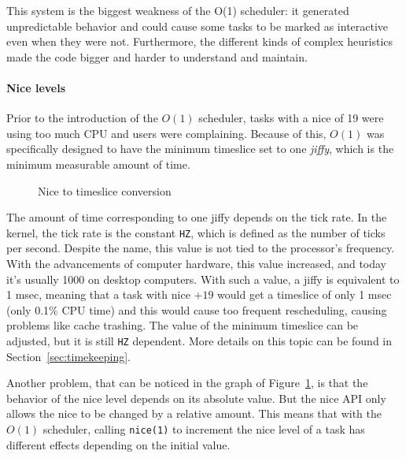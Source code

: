 This system is the biggest weakness of the O(1) scheduler: it generated unpredictable behavior and could cause some tasks to be marked as interactive even when they were not. Furthermore, the different kinds of complex heuristics made the code bigger and harder to understand and maintain.

\paragraph{Nice levels} 
Prior to the introduction of the $O(1)$ scheduler, tasks with a nice of 19 were using too much CPU and users were complaining.\cite{nice_design} Because of this, $O(1)$ was specifically designed to have the minimum timeslice set to one \textit{jiffy}, which is the minimum measurable amount of time.  
\begin{figure}[t] %
  \centering
  \caption{Nice to timeslice conversion}
  \label{fig:timeslice_vs_nice}
\end{figure}%
The amount of time corresponding to one jiffy depends on the tick
rate. In the kernel, the tick rate is the constant \verb|HZ|, which is defined as the number of ticks per second. Despite the name, this value is not tied to the processor's frequency. 
With the advancements of
computer hardware, this value increased, and today it's usually 1000 on desktop computers. With such a value, a jiffy is equivalent to 1 msec, meaning that a task with nice $+19$
would get a timeslice of only 1 msec (only 0.1\% CPU time) and this would cause too frequent
rescheduling, causing problems like cache trashing. The value of the
minimum timeslice can be adjusted, but it is still \verb|HZ| dependent. More
details on this topic can be found in Section~\ref{sec:timekeeping}.

Another problem, that can be noticed in the graph of
Figure~\ref{fig:timeslice_vs_nice}, is that the behavior of the nice
level depends on its absolute value. But the nice API only allows the nice to be changed by a relative amount. 
This means that with the $O(1)$ scheduler, calling \verb|nice(1)| to increment the nice level of a task has different effects depending on the initial value. 

